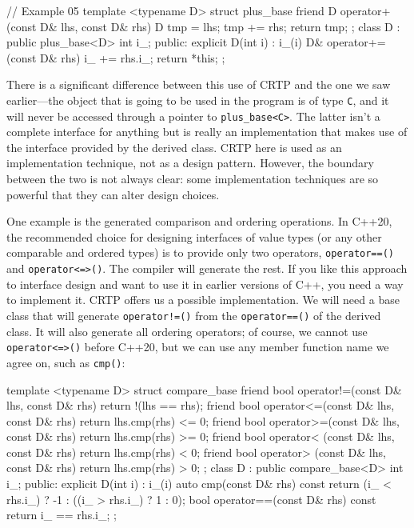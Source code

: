 \begin{code}
// Example 05
template <typename D> struct plus_base {
  friend D operator+(const D& lhs, const D& rhs) {
    D tmp = lhs;
    tmp += rhs;
    return tmp;
  }
};
class D : public plus_base<D> {
  int i_;
  public:
  explicit D(int i) : i_(i) {}
  D& operator+=(const D& rhs) {
    i_ += rhs.i_;
    return *this;
  }
};
\end{code}

There is a significant difference between this use of CRTP and the one we saw earlier---the object that is going to be used in the program is of type \texttt{C}, and it will never be accessed through a pointer to \texttt{plus\_base\textless{}C\textgreater{}}. The latter isn't a complete interface for anything but is really an implementation that makes use of the interface provided by the derived class. CRTP here is used as an implementation technique, not as a design pattern. However, the boundary between the two is not always clear: some implementation techniques are so powerful that they can alter design choices.

One example is the generated comparison and ordering operations. In C++20, the recommended choice for designing interfaces of value types (or any other comparable and ordered types) is to provide only two operators, \texttt{operator==()} and \texttt{operator\textless{}=\textgreater{}()}. The compiler will generate the rest. If you like this approach to interface design and want to use it in earlier versions of C++, you need a way to implement it. CRTP offers us a possible implementation. We will need a base class that will generate \texttt{operator!=()} from the \texttt{operator==()} of the derived class. It will also generate all ordering operators; of course, we cannot use \texttt{operator\textless{}=\textgreater{}()} before C++20, but we can use any member function name we agree on, such as \texttt{cmp()}:

\begin{code}
template <typename D> struct compare_base {
  friend bool operator!=(const D& lhs, const D& rhs) {
    return !(lhs == rhs); }
  friend bool operator<=(const D& lhs, const D& rhs) {
    return lhs.cmp(rhs) <= 0;
  }
  friend bool operator>=(const D& lhs, const D& rhs) {
    return lhs.cmp(rhs) >= 0;
  }
  friend bool operator< (const D& lhs, const D& rhs) {
    return lhs.cmp(rhs) <  0;
  }
  friend bool operator> (const D& lhs, const D& rhs) {
    return lhs.cmp(rhs) >  0;
  }
};
class D : public compare_base<D> {
  int i_;
  public:
  explicit D(int i) : i_(i) {}
  auto cmp(const D& rhs) const {
    return (i_ < rhs.i_) ? -1 : ((i_ > rhs.i_) ? 1 : 0);
  }
  bool operator==(const D& rhs) const {
    return i_ == rhs.i_;
  }
};
\end{code}

